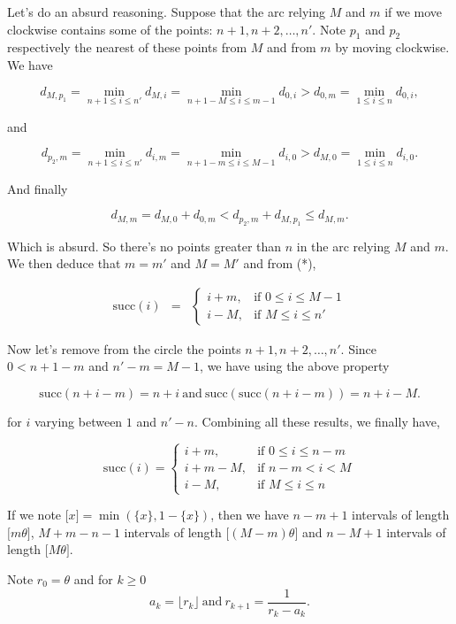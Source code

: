 \documentclass[a4paper,12pt]{article}
\begin{document}
Let's do an absurd reasoning. Suppose that the arc relying $M$ and $m$
if we move clockwise contains some of the points: $n+1, n+2, \ldots,
n'$.  Note $p_1$ and $p_2$ respectively the nearest of these points
from $M$ and from $m$ by moving  clockwise.  We have

\[  d_{M, p_1} = \min_{n+1\le i\le n'}d_{M, i} = \min_{n+1-M \le i\le
    m-1}d_{0, i} > d_{0,m} = \min_{1\le i\le n}d_{0,i},\]

and

\[ d_{p_2, m} = \min_{n+1\le i\le n'}d_{i, m} = \min_{n+1-m\le i\le
  M-1} d_{i,0} > d_{M, 0} = \min_{1\le i\le n}d_{i,0}.\]

And finally

\[ d_{M,m} = d_{M, 0} + d_{0, m} < d_{p_2,m} + d_{M,p_1} \le
d_{M,m}.\]

Which is absurd.  So there's no points greater than $n$ in the arc
relying $M$ and $m$.  We then deduce that $m = m'$ and $M = M'$ and
from (*),

\begin{eqnarray*}
  \mathrm{succ}(i) &=& \left\{
  \begin{array}{ll}
    i+m,&\mbox{if $0\le i\le M-1$} \\
    i-M,&\mbox{if $M\le i\le n'$}
  \end{array}
  \right.
\end{eqnarray*}

Now let's remove from the circle the points $n+1, n+2, \ldots, n'$.
Since $0 < n+1-m$ and $n' - m = M-1$, we have using the above property

\[ \mathrm{succ}(n+i-m) =
n+i\ \mbox{and}\ \mathrm{succ}(\mathrm{succ}(n+i-m)) = n+i-M.\]

for $i$ varying between $1$ and $n'-n$.  Combining all these results,
we finally have,

\[
\mathrm{succ}(i) = \left\{
\begin{array}{ll}
  i+m,&\mbox{if $0\le i\le n-m$} \\
  i+m-M,&\mbox{if $n-m < i < M$} \\
  i-M,&\mbox{if $M\le i\le n$}
\end{array}
\right.
\]

If we note $\lbrack x\rbrack = \min(\{x\}, 1-\{x\})$, then we have
$n-m+1$ intervals of length $\lbrack m\theta\rbrack$, $M+m-n-1$
intervals of length $\lbrack(M-m)\theta\rbrack$ and $n-M+1$ intervals
of length $\lbrack M\theta\rbrack$.

\bigskip
Note $r_0 = \theta$ and for $k \ge 0$
\[ a_k = \lfloor r_k\rfloor\ \mbox{and}\ r_{k+1} = \frac{1}{r_k -
  a_k}.\]
\end{document}
